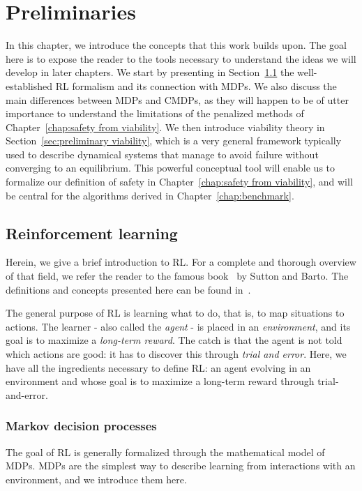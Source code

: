 \chapter{Preliminaries} \label{chap:prelim}

	In this chapter, we introduce the concepts that this work builds upon. The goal here is to expose the reader to the tools necessary to understand the ideas we will develop in later chapters. We start by presenting in Section~\ref{sec:preliminary RL} the well-established RL formalism and its connection with MDPs. We also discuss the main differences between MDPs and CMDPs, as they will happen to be of utter importance to understand the limitations of the penalized methods of Chapter~\ref{chap:safety from viability}. We then introduce viability theory in Section~\ref{sec:preliminary viability}, which is a very general framework typically used to describe dynamical systems that manage to avoid failure without converging to an equilibrium. This powerful conceptual tool will enable us to formalize our definition of safety in Chapter~\ref{chap:safety from viability}, and will be central for the algorithms derived in Chapter~\ref{chap:benchmark}.
	
	\section{Reinforcement learning} \label{sec:preliminary RL}
		Herein, we give a brief introduction to RL. For a complete and thorough overview of that field, we refer the reader to the famous book~\cite{sutton2018reinforcement} by Sutton and Barto. The definitions and concepts presented here can be found in~\cite[Chapter\,3]{sutton2018reinforcement}.\par
		The general purpose of RL is learning what to do, that is, to map situations to actions. The learner - also called the\emph{ agent} - is placed in an\emph{ environment}, and its goal is to maximize a\emph{ long-term reward}. The catch is that the agent is not told which actions are good: it has to discover this through\emph{ trial and error}. Here, we have all the ingredients necessary to define RL: an agent evolving in an environment and whose goal is to maximize a long-term reward through trial-and-error. 
		
		\subsection{Markov decision processes}
			The goal of RL is generally formalized through the mathematical model of MDPs. MDPs are the simplest way to describe learning from interactions with an environment, and we introduce them here.
